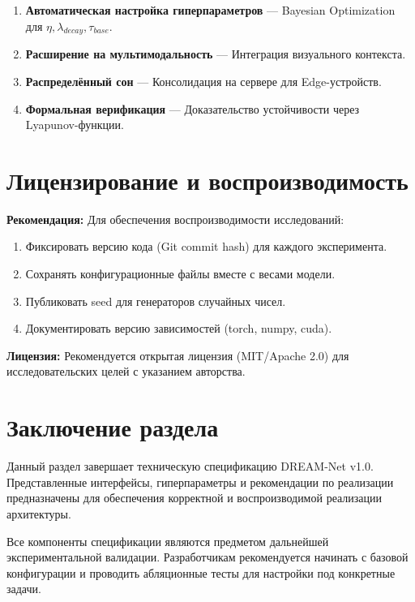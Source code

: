 \begin{enumerate}
    \item \textbf{Автоматическая настройка гиперпараметров} — Bayesian Optimization для $\eta, \lambda_{decay}, \tau_{base}$.
    
    \item \textbf{Расширение на мультимодальность} — Интеграция визуального контекста.
    
    \item \textbf{Распределённый сон} — Консолидация на сервере для Edge-устройств.
    
    \item \textbf{Формальная верификация} — Доказательство устойчивости через Lyapunov-функции.
\end{enumerate}

\section{Лицензирование и воспроизводимость}

\textbf{Рекомендация:} Для обеспечения воспроизводимости исследований:

\begin{enumerate}
    \item Фиксировать версию кода (Git commit hash) для каждого эксперимента.
    \item Сохранять конфигурационные файлы вместе с весами модели.
    \item Публиковать seed для генераторов случайных чисел.
    \item Документировать версию зависимостей (torch, numpy, cuda).
\end{enumerate}

\textbf{Лицензия:} Рекомендуется открытая лицензия (MIT/Apache 2.0) для исследовательских целей с указанием авторства.

\section{Заключение раздела}

Данный раздел завершает техническую спецификацию DREAM-Net v1.0. Представленные интерфейсы, гиперпараметры и рекомендации по реализации предназначены для обеспечения корректной и воспроизводимой реализации архитектуры.

Все компоненты спецификации являются предметом дальнейшей экспериментальной валидации. Разработчикам рекомендуется начинать с базовой конфигурации и проводить абляционные тесты для настройки под конкретные задачи.
